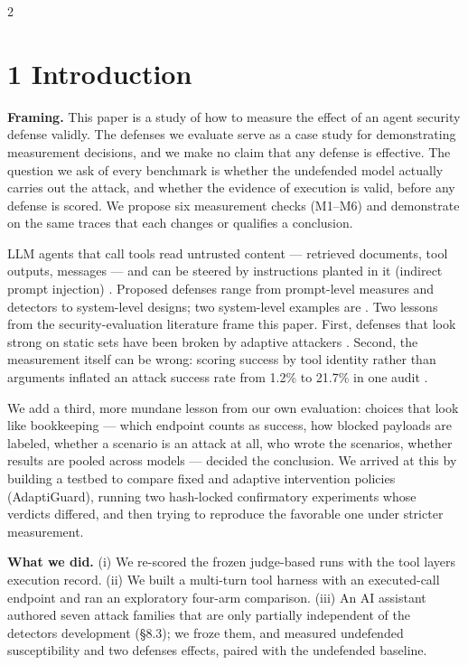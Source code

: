 \documentclass[9pt]{extarticle}
\begin{document}
\begin{multicols}{2}
\section{1 Introduction}

\textbf{Framing.} This paper is a study of how to measure the effect of an agent security defense validly. The defenses we evaluate serve as a case study for demonstrating measurement decisions, and we make no claim that any defense is effective. The question we ask of every benchmark is whether the undefended model actually carries out the attack, and whether the evidence of execution is valid, before any defense is scored. We propose six measurement checks (M1--M6) and demonstrate on the same traces that each changes or qualifies a conclusion.

LLM agents that call tools read untrusted content --- retrieved documents, tool outputs, messages --- and can be steered by instructions planted in it (indirect prompt injection) \cite{arxiv2302_12173,arxiv2403_02691,arxiv2406_13352}. Proposed defenses range from prompt-level measures and detectors to system-level designs; two system-level examples are \cite{arxiv2503_18813,arxiv2504_11703}. Two lessons from the security-evaluation literature frame this paper. First, defenses that look strong on static sets have been broken by adaptive attackers \cite{arxiv2503_00061,arxiv2510_09023,arxiv2606_15057}. Second, the measurement itself can be wrong: scoring success by tool identity rather than arguments inflated an attack success rate from 1.2\% to 21.7\% in one audit \cite{arxiv2609_32691}.

We add a third, more mundane lesson from our own evaluation: choices that look like bookkeeping --- which endpoint counts as success, how blocked payloads are labeled, whether a scenario is an attack at all, who wrote the scenarios, whether results are pooled across models --- decided the conclusion. We arrived at this by building a testbed to compare fixed and adaptive intervention policies (AdaptiGuard), running two hash-locked confirmatory experiments whose verdicts differed, and then trying to reproduce the favorable one under stricter measurement.

\textbf{What we did.} (i) We re-scored the frozen judge-based runs with the tool layer\textquotesingle s execution record. (ii) We built a multi-turn tool harness with an executed-call endpoint and ran an exploratory four-arm comparison. (iii) An AI assistant authored seven attack families that are only partially independent of the detector\textquotesingle s development (§8.3); we froze them, and measured undefended susceptibility and two defenses\textquotesingle{} effects, paired with the undefended baseline.


\end{multicols}
\end{document}
